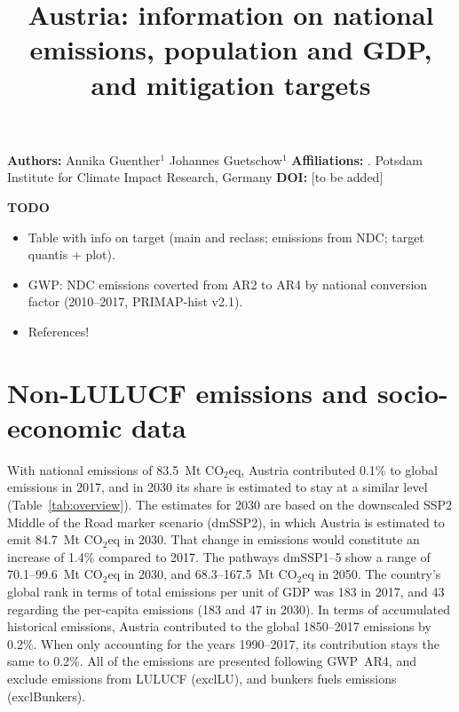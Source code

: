 \documentclass[12pt]{article}
\title{ \bfseries \color{PIKorange} Austria: information on national emissions, population and GDP, and mitigation targets}
\begin{document}
 \maketitle

 \noindent \textbf{Authors:} \newline
 \indent Annika Guenther$^{1}$ \newline
 \indent Johannes Guetschow$^{1}$ \newline
 \noindent \textbf{Affiliations:} \newline
 . Potsdam Institute for Climate Impact Research, Germany \newline
 \noindent \textbf{DOI:} [to be added] \newline

 \textbf{TODO}
 \begin{itemize}
 \item Table with info on target (main and reclass; emissions from NDC; target quantis + plot).
 \item GWP: NDC emissions coverted from AR2 to AR4 by national conversion factor (2010--2017, PRIMAP-hist v2.1).
 \item References!
 \end{itemize}

 \section{Non-LULUCF emissions and socio-economic data}
 \label{sec:nonLULUCFSocioEco}
 With national emissions of 83.5~Mt CO$_2$eq, Austria contributed 0.1\% to global emissions in 2017, and in 2030 its share is estimated to stay at a similar level (Table~\ref{tab:overview}).
 The estimates for 2030 are based on the downscaled SSP2 Middle of the Road marker scenario (dmSSP2), in which Austria is estimated to emit 84.7~Mt CO$_2$eq in 2030.
 That change in emissions would constitute an increase of 1.4\% compared to 2017. 
 The pathways dmSSP1--5 show a range of 70.1--99.6~Mt CO$_2$eq in 2030, and 68.3--167.5~Mt CO$_2$eq in 2050.
 The country's global rank in terms of total emissions per unit of GDP was 183 in 2017, and 43 regarding the per-capita emissions (183 and 47 in 2030).
 In terms of accumulated historical emissions, Austria contributed to the global 1850--2017 emissions by 0.2\%. 
 When only accounting for the years 1990--2017, its contribution stays the same to 0.2\%.
 All of the emissions are presented following GWP~AR4, and exclude emissions from LULUCF (exclLU), and bunkers fuels emissions (exclBunkers).
\end{document}
